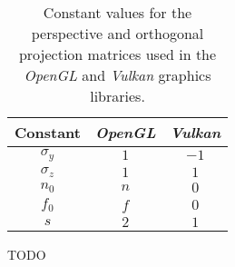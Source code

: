 \begin{table}[htb]
	\centering
	\begin{tabular}{|c|cc|}
		\hline
		    Constant &  \textit{OpenGL} &   \textit{Vulkan} \tabularnewline
		\hline
		  $\sigma_y$ &              $1$ &              $-1$ \tabularnewline
		  $\sigma_z$ &              $1$ &               $1$ \tabularnewline
		       $n_0$ &              $n$ &               $0$ \tabularnewline
		       $f_0$ &              $f$ &               $0$ \tabularnewline
		         $s$ &              $2$ &               $1$ \tabularnewline
		\hline
	\end{tabular}
	\caption[Projection matrix constants]{
		Constant values for the perspective and orthogonal projection matrices used in the
		\textit{OpenGL} \cite{web_OpenGL} and \textit{Vulkan} \cite{web_Vulkan} graphics libraries.}
	\label{tab:gl_constants}
\end{table}

TODO
